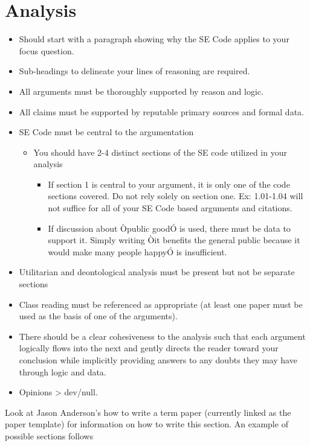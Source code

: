 \documentclass[11pt]{article}
\begin{document}
\section{Analysis}
\begin{itemize}
   \item Should start with a paragraph showing why the SE Code applies to your focus question.
   \item Sub-headings to delineate your lines of reasoning are required.
   \item All arguments must be thoroughly supported by reason and logic.
   \item All claims must be supported by reputable primary sources and formal data.
   \item SE Code must be central to the argumentation
   \begin{itemize}
      \item You should have 2-4 distinct sections of the SE code utilized in your analysis
      \begin{itemize}
         \item If section 1 is central to your argument, it is only one of the code sections covered. Do not rely solely on section one. Ex: 1.01-1.04 will not suffice for all of your SE Code based arguments and citations.
         \item If discussion about Òpublic goodÓ is used, there must be data to support it. Simply writing Òit benefits the general public because it would make many people happyÓ is insufficient.
      \end{itemize}
   \end{itemize}
   \item Utilitarian and deontological analysis must be present but not be separate sections
   \item Class reading must be referenced as appropriate (at least one paper must be used as the basis of one of the arguments).
   \item There should be a clear cohesiveness to the analysis such that each argument logically flows into the next and gently directs the reader toward your conclusion while implicitly providing answers to any doubts they may have through logic and data.
   \item Opinions > dev/null. \cite{handout}
\end{itemize}

Look at Jason Anderson's how to write a term paper (currently linked as the paper template) for information on how to write this section.  An example of possible sections follows
\end{document}
